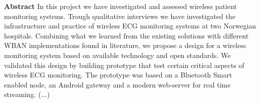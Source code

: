 \noindent \textbf{Abstract}
\newline	
\noindent
In this project we have investigated and assessed wireless patient monitoring systems. Trough qualitative interviews we have investigated the infrastructure and practice of wireless ECG monitoring systems at two Norwegian hospitals. Combining what we learned from the existing solutions with different WBAN implementations found in literature, we propose a design for a wireless monitoring system based on available technology and open standards. We validated this design by building prototype that test certain critical aspects of wireless ECG monitoring. The prototype was based on a Bluetooth Smart enabled node, an Android gateway and a modern web-server for real time streaming. (...)

